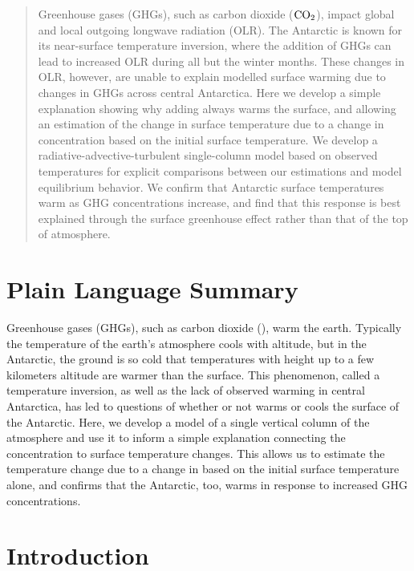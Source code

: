 \documentclass[draft]{agujournal2019}
\begin{document}
\begin{abstract}
Greenhouse gases (GHGs), such as carbon dioxide ($\ce{CO_2}$), impact global and local outgoing longwave radiation (OLR). The Antarctic is known for its near-surface temperature inversion, where the addition of GHGs can lead to increased OLR during all but the winter months. These changes in OLR, however, are unable to explain modelled surface warming due to changes in GHGs across central Antarctica. Here we develop a simple explanation showing why adding  always warms the surface, and allowing an estimation of the change in surface temperature due to a change in  concentration based on the initial surface temperature. We develop a radiative-advective-turbulent single-column model based on observed temperatures for explicit comparisons between our estimations and model equilibrium behavior. We confirm that Antarctic surface temperatures warm as GHG concentrations increase, and find that this response is best explained through the surface greenhouse effect rather than that of the top of atmosphere.
\end{abstract}

\section*{Plain Language Summary}
Greenhouse gases (GHGs), such as carbon dioxide (), warm the earth. Typically the temperature of the earth's atmosphere cools with altitude, but in the Antarctic, the ground is so cold that temperatures with height up to a few kilometers altitude are warmer than the surface. This phenomenon, called a temperature inversion, as well as the lack of observed warming in central Antarctica, has led to questions of whether or not  warms or cools the surface of the Antarctic. Here, we develop a model of a single vertical column of the atmosphere and use it to inform a simple explanation connecting the  concentration to surface temperature changes. This allows us to estimate the temperature change due to a change in  based on the initial surface temperature alone, and confirms that the Antarctic, too, warms in response to increased GHG concentrations.


%
%

\section{Introduction}
%
\end{document}
